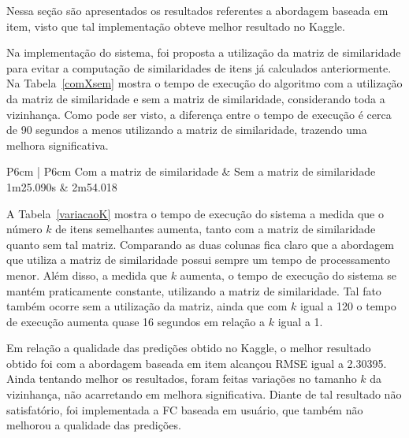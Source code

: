 \documentclass[brazil,a4paper,11pt]{article}
\begin{document}
Nessa seção são apresentados os resultados referentes a abordagem baseada em item, visto que tal implementação obteve melhor resultado no Kaggle.

Na implementação do sistema, foi proposta a utilização da matriz de similaridade para evitar a computação de similaridades de itens já calculados anteriormente. Na Tabela~\ref{comXsem} mostra o tempo de execução do algoritmo com a utilização da matriz de similaridade e sem a matriz de similaridade, considerando toda a vizinhança. Como pode ser visto, a diferença entre o tempo de execução é cerca de 90 segundos a menos utilizando a matriz de similaridade, trazendo uma melhora significativa.

\begin{table}[!t]
  \centering
  \begin{tabular}{P{6cm} | P{6cm} }
  \hline\hline
  Com a matriz de similaridade & Sem a matriz de similaridade \\
       1m25.090s          &   2m54.018   \\ \hline\hline
  \end{tabular}
    \caption{Tempo de execução com e sem a matriz de similaridade, considerando toda a vizinhança.}
      \label{comXsem}
\end{table}

A Tabela~\ref{variacaoK} mostra o tempo de execução do sistema a medida que o número $k$ de itens semelhantes aumenta, tanto com a matriz de similaridade quanto sem tal matriz. Comparando as duas colunas fica claro que a abordagem que utiliza a matriz de similaridade possui sempre um tempo de processamento menor. Além disso, a medida que $k$ aumenta, o tempo de execução do sistema se mantém praticamente constante, utilizando a matriz de similaridade. Tal fato também ocorre sem a utilização da matriz, ainda que com $k$ igual a 120 o tempo de execução aumenta quase 16 segundos em relação a $k$ igual a 1. 

Em relação a qualidade das predições obtido no Kaggle, o melhor resultado obtido foi com a abordagem baseada em item alcançou RMSE igual a 2.30395. Ainda tentando melhor os resultados, foram feitas variações no tamanho $k$ da vizinhança, não acarretando em melhora significativa. Diante de tal resultado não satisfatório, foi implementada a FC baseada em usuário, que também não melhorou a qualidade das predições. 
\end{document}
